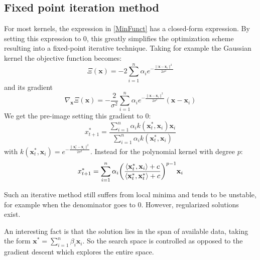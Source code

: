 \documentclass[12pt, letterpaper]{article}
\theoremstyle{definition}
\newcommand{\x}{\mathbf{x}}
\DeclarePairedDelimiter\autobracket{(}{)}
\newcommand{\br}[1]{\autobracket*{#1}}
\begin{document}
\subsection{Fixed point iteration method}
For most kernels, the expression in \ref{MinFunct} has a closed-form expression. By setting this expression to $0$, this greatly simplifies the optimization scheme resulting into a fixed-point iterative technique. Taking for example the Gaussian kernel the objective function becomes:
\begin{equation}
\Xi(\x) = -2 \sum_{i=1}^n \alpha_i e^{-\frac{\|\x-\x_i\|^2}{2\sigma^2}}
\end{equation}
and its gradient
\begin{equation}
\nabla_\x\Xi(\x) = -\frac{2}{\sigma^2} \sum_{i=1}^n \alpha_i e^{-\frac{\|\x-\x_i\|^2}{2\sigma^2}}(\x - \x_i)
\end{equation}
We get the pre-image setting this gradient to $0$:
\begin{equation}
x^*_{t+1} = \frac{\sum_{i=1}^n \alpha_i k(\x^*_t,\x_i)\x_i}{ \sum_{i=1}^n \alpha_i k(\x^*_t,\x_i)}
\end{equation}
with $k(\x^*_t,\x_i)= e^{-\frac{\|\x_t^*-\x_i\|^2}{2\sigma^2}}$. Instead for the polynomial kernel with degree $p$:
\begin{equation}
x^*_{t+1} =\sum_{i=1}^n   \alpha_i\br{\frac{  \langle\x^*_t,\x_i\rangle+c}{\langle\x^*_t,\x^*_t\rangle+c}}^{p-1}\x_i
\end{equation}

Such an iterative method still suffers from local minima and tends to be unstable, for example when the denominator goes to $0$. However, regularized solutions exist.

An interesting fact is that the solution lies in the span of available data, taking the form $\x^* = \sum_{i=1}^n \beta_i \x_i$. So the search space is controlled as opposed to the gradient descent which explores the entire space.
\end{document}
